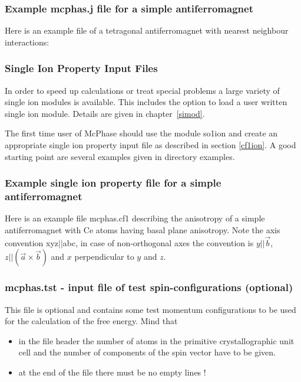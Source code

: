 \subsubsection{Example {\prg mcphas.j} file for a simple antiferromagnet}

Here is an example file of a tetragonal antiferromagnet with nearest neighbour interactions:



\subsubsection{Single Ion Property Input Files}\label{sifile}

In order to speed up calculations or treat special problems a large 
variety of single ion modules is available. This includes the
option to load a user written single ion module. Details are 
given in chapter~\ref{simod}.

The first time user of {\prg McPhase} should use the module {\prg so1ion} and 
create an appropriate single ion property input file as described in
section \ref{cf1ion}. A good starting point are several examples
given in directory {\prg examples}.


\subsubsection{Example single ion property file  for a simple antiferromagnet}

Here is an example file {\prg mcphas.cf1} describing the anisotropy of a 
simple antiferromagnet with Ce atoms having basal plane anisotropy. Note the
axis convention xyz$||$abc, in case of non-orthogonal axes the convention 
is $y||\vec b$, $z||(\vec a \times \vec b)$ and $x$ perpendicular to $y$ and $z$.




\subsubsection{{\prg mcphas.tst} - input file of test spin-configurations (optional)}
This file is optional and contains
some test momentum configurations to be used for the calculation
             of the free energy. Mind that
\begin{itemize}
\item  in the file header the number of atoms in the primitive
       crystallographic unit cell and the number of components
       of the spin vector have to be given.
\item  at the end of the
 file there must be no empty lines !
\end{itemize}

